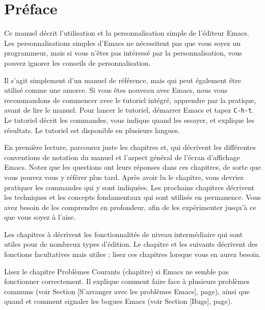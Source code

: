 {}
\section*{Préface}\label{preface}
Ce manuel décrit l'utilisation et la personnalisation simple de
l'éditeur Emacs. Les personnalisations simples d'Emacs ne nécessitent
pas que vous soyez un programmeur, mais si vous n'êtes pas intéressé
par la personnalisation, vous pouvez ignorer les conseils de
personnalisation. \par

Il s'agit simplement d'un manuel de référence, mais qui peut également
être utilisé comme une amorce. Si vous êtes nouveau avec Emacs, nous
vous recommandons de commencer avec le tutoriel intégré, apprendre par
la pratique, avant de lire le manuel. Pour lancer le tutoriel, démarrer
Emacs et tapez \texttt{C-h-t}. Le tutoriel décrit les commandes, vous
indique quand les essayer, et explique les résultats. Le tutoriel est
disponible en plusieurs langues.\par

En première lecture, parcourez juste les chapitres
et, qui décrivent les différentes conventions de notation
du manuel et l'aspect général de l'écran d'affichage Emacs. Notez que
les questions ont leurs réponses dans ces chapitres, de sorte que vous
pouvez vous y référer plus tard. Après avoir lu le
chapitre, vous devriez pratiquer les commandes qui y sont
indiquées. Les prochains chapitres décrivent les techniques et les
concepts fondamentaux qui sont utilisés en permanence. Vous avez
besoin de les comprendre en profondeur, afin de les expérimenter
jusqu'à ce que vous soyez à l'aise. \par 

Les chapitres à décrivent les
fonctionnalités de niveau intermédiaire qui sont utiles pour de
nombreux types d'édition. Le chapitre et les suivants
décrivent des fonctions facultatives mais utiles ; lisez ces chapitres
lorsque vous en aurez besoin. \par 

Lisez le chapitre Problèmes Courants (chapitre) si Emacs
ne semble pas fonctionner correctement. Il explique comment faire face
à plusieurs problèmes communs (voir Section
[S'arranger avec les problèmes Emacs], page),
ainsi que quand et comment signaler les bogues Emacs (voir
Section [Bugs], page). \par 

